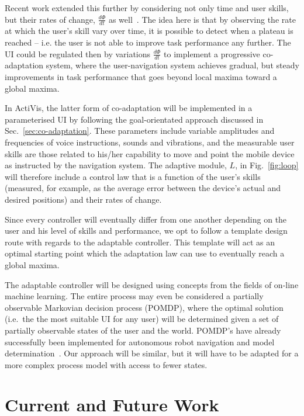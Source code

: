 \documentclass[letterpaper]{article}
\begin{document}
Recent work extended this further by considering not only time and user skills, but their rates of change, $\frac{d\Phi}{dt}$ as well~\cite{gallina2015}. The idea here is that by observing the rate at which the user's skill vary over time, it is possible to detect when a plateau is reached -- i.e. the user is not able to improve task performance any further. The UI could be regulated then by variations $\frac{d\Phi}{dt}$ to implement a progressive co-adaptation system, where the user-navigation system achieves gradual, but steady improvements in task performance that goes beyond local maxima toward a global maxima.

In ActiVis, the latter form of co-adaptation will be implemented in a parameterised UI by following the goal-orientated approach discussed in Sec.~\ref{sec:co-adaptation}. These parameters include variable amplitudes and frequencies of voice instructions, sounds and vibrations, and the measurable user skills are those related to his/her capability to move and point the mobile device as instructed by the navigation system. The adaptive module, $L$, in Fig.~\ref{fig:loop} will therefore include a control law that is a function of the user's skills (measured, for example, as the average error between the device's actual and desired positions) and their rates of change.

Since every controller will eventually differ from one another depending on the user and his level of skills and performance, we opt to follow a template design route with regards to the adaptable controller. This template will act as an optimal starting point which the adaptation law can use to eventually reach a global maxima. 

The adaptable controller will be designed using concepts from the fields of on-line machine learning. The entire process may even be considered a partially observable Markovian decision process (POMDP), where the optimal solution (i.e.\ the the most suitable UI for any user) will be determined given a set of partially observable states of the user and the world. POMDP's have already successfully been implemented for autonomous robot navigation and model determination~\cite{ross2008bayesian}. Our approach will be similar, but it will have to be adapted for a more complex process model with access to fewer states. 

\section{Current and Future Work}\label{sec:work}
\end{document}
